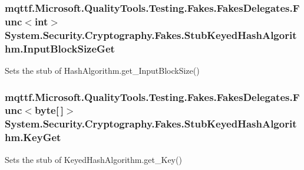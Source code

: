 \hypertarget{class_system_1_1_security_1_1_cryptography_1_1_fakes_1_1_stub_keyed_hash_algorithm_a2376e12319cdbb3ce3a81994a7625b9a}{
\subsubsection[{Input\-Block\-Size\-Get}]{\setlength{\rightskip}{0pt plus 5cm}mqttf.\-Microsoft.\-Quality\-Tools.\-Testing.\-Fakes.\-Fakes\-Delegates.\-Func$<$int$>$ System.\-Security.\-Cryptography.\-Fakes.\-Stub\-Keyed\-Hash\-Algorithm.\-Input\-Block\-Size\-Get}}\label{class_system_1_1_security_1_1_cryptography_1_1_fakes_1_1_stub_keyed_hash_algorithm_a2376e12319cdbb3ce3a81994a7625b9a}


Sets the stub of Hash\-Algorithm.\-get\-\_\-\-Input\-Block\-Size()

\hypertarget{class_system_1_1_security_1_1_cryptography_1_1_fakes_1_1_stub_keyed_hash_algorithm_a518cece66c583e2955ffbfde52fbaea1}{
\subsubsection[{Key\-Get}]{\setlength{\rightskip}{0pt plus 5cm}mqttf.\-Microsoft.\-Quality\-Tools.\-Testing.\-Fakes.\-Fakes\-Delegates.\-Func$<$byte\mbox{[}$\,$\mbox{]}$>$ System.\-Security.\-Cryptography.\-Fakes.\-Stub\-Keyed\-Hash\-Algorithm.\-Key\-Get}}\label{class_system_1_1_security_1_1_cryptography_1_1_fakes_1_1_stub_keyed_hash_algorithm_a518cece66c583e2955ffbfde52fbaea1}


Sets the stub of Keyed\-Hash\-Algorithm.\-get\-\_\-\-Key()

